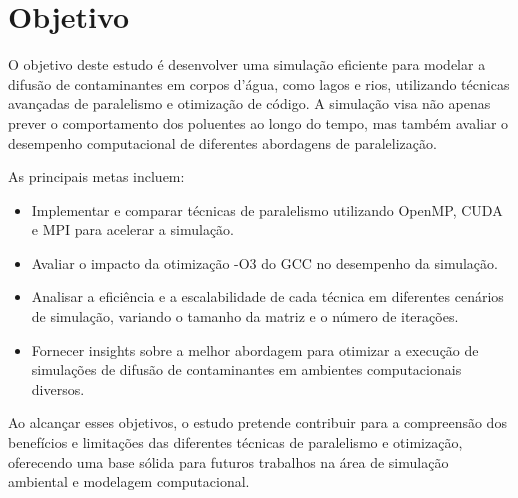 \section{Objetivo}

O objetivo deste estudo é desenvolver uma simulação eficiente para modelar a difusão de contaminantes em corpos d'água, como lagos e rios, utilizando técnicas avançadas de paralelismo e otimização de código. A simulação visa não apenas prever o comportamento dos poluentes ao longo do tempo, mas também avaliar o desempenho computacional de diferentes abordagens de paralelização.

As principais metas incluem:

\begin{itemize}
    \item Implementar e comparar técnicas de paralelismo utilizando OpenMP, CUDA e MPI para acelerar a simulação.
    \item Avaliar o impacto da otimização -O3 do GCC no desempenho da simulação.
    \item Analisar a eficiência e a escalabilidade de cada técnica em diferentes cenários de simulação, variando o tamanho da matriz e o número de iterações.
    \item Fornecer insights sobre a melhor abordagem para otimizar a execução de simulações de difusão de contaminantes em ambientes computacionais diversos.
\end{itemize}

Ao alcançar esses objetivos, o estudo pretende contribuir para a compreensão dos benefícios e limitações das diferentes técnicas de paralelismo e otimização, oferecendo uma base sólida para futuros trabalhos na área de simulação ambiental e modelagem computacional.
